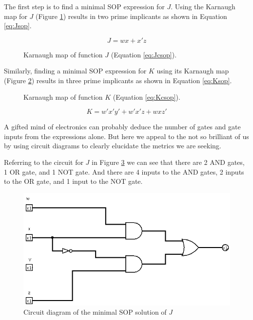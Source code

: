 \documentclass[12pt]{article}
\begin{document}
\begin{samepage}
The first step is to find a minimal SOP expression for $J$.
Using the Karnaugh map for $J$ (Figure \ref{fig:Jmap})
results in two prime implicants as shown in Equation \ref{eq:Jsop}.

\begin{equation}
	J = w x + x' z  \label{eq:Jsop}
\end{equation}
\end{samepage}

\begin{figure}[!hbt]
\begin{center}
\end{center}
\caption{Karnaugh map of function $J$ (Equation \ref{eq:Jcsop}).}
\label{fig:Jmap}
\end{figure}

Similarly, finding a minimal SOP expression for $K$ using its
Karnaugh map (Figure \ref{fig:Kmap}) results in three prime implicants
as shown in Equation \ref{eq:Ksop}.

\begin{figure}[!hbt]
\begin{center}
\end{center}
\caption{Karnaugh map of function $K$ (Equation \ref{eq:Kcsop}).}
\label{fig:Kmap}
\end{figure}

\begin{equation}
	K = w'x'y' + w'x'z + wxz'  \label{eq:Ksop}
\end{equation}

A gifted mind of electronics can probably deduce the number of
gates and gate inputs from the expressions alone.
But here we appeal to the not so brilliant of us by using
circuit diagrams to clearly elucidate the metrics we
are seeking.

Referring to the circuit for $J$ in Figure \ref{fig:Jminsop-01} we
can see that there are 2 AND gates, 1 OR gate, and 1 NOT gate.
And there are 4 inputs to the AND gates, 2 inputs to the OR gate,
and 1 input to the NOT gate.

\begin{figure}[htb]
\center
\includegraphics[scale=0.5]{Jminsop-01}
\caption{Circuit diagram of the minimal SOP solution of $J$}
\label{fig:Jminsop-01}
\end{figure}
\end{document}
